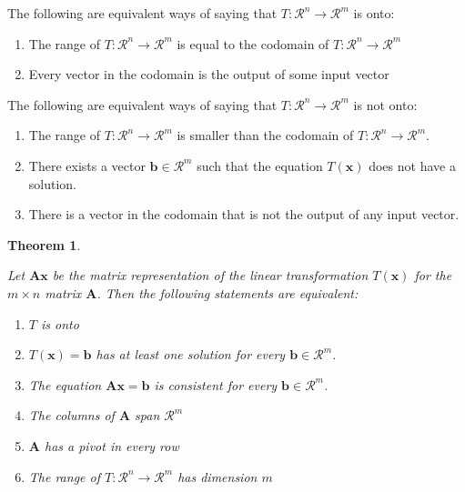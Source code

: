 \documentclass[
]{book}
\newtheorem{theorem}{Theorem}[chapter]
\theoremstyle{definition}
\theoremstyle{definition}
\theoremstyle{definition}
\theoremstyle{remark}
\begin{document}
The following are equivalent ways of saying that \(T:\mathcal{R}^n \rightarrow \mathcal{R}^m\) is onto:

\begin{enumerate}
\def\labelenumi{\arabic{enumi})}
\item
  The range of \(T:\mathcal{R}^n \rightarrow \mathcal{R}^m\) is equal to the codomain of \(T:\mathcal{R}^n \rightarrow \mathcal{R}^m\)
\item
  Every vector in the codomain is the output of some input vector
\end{enumerate}

The following are equivalent ways of saying that \(T:\mathcal{R}^n \rightarrow \mathcal{R}^m\) is not onto:

\begin{enumerate}
\def\labelenumi{\arabic{enumi})}
\item
  The range of \(T:\mathcal{R}^n \rightarrow \mathcal{R}^m\) is smaller than the codomain of \(T:\mathcal{R}^n \rightarrow \mathcal{R}^m\).
\item
  There exists a vector \(\mathbf{b} \in \mathcal{R}^m\) such that the equation \(T(\mathbf{x})\) does not have a solution.
\item
  There is a vector in the codomain that is not the output of any input vector.
\end{enumerate}

\begin{theorem}
\protect\hypertarget{thm:unlabeled-div-72}{}\label{thm:unlabeled-div-72}

Let \(\mathbf{A}\mathbf{x}\) be the matrix representation of the linear transformation \(T(\mathbf{x})\) for the \(m \times n\) matrix \(\mathbf{A}\). Then the following statements are equivalent:

\begin{enumerate}
\def\labelenumi{\arabic{enumi})}
\item
  \(T\) is onto
\item
  \(T(\mathbf{x}) = \mathbf{b}\) has at least one solution for every \(\mathbf{b} \in \mathcal{R}^m\).
\item
  The equation \(\mathbf{A}\mathbf{x} = \mathbf{b}\) is consistent for every \(\mathbf{b} \in \mathcal{R}^m\).
\item
  The columns of \(\mathbf{A}\) span \(\mathcal{R}^m\)
\item
  \(\mathbf{A}\) has a pivot in every row
\item
  The range of \(T:\mathcal{R}^n \rightarrow \mathcal{R}^m\) has dimension \(m\)
\end{enumerate}

\end{theorem}
\end{document}
